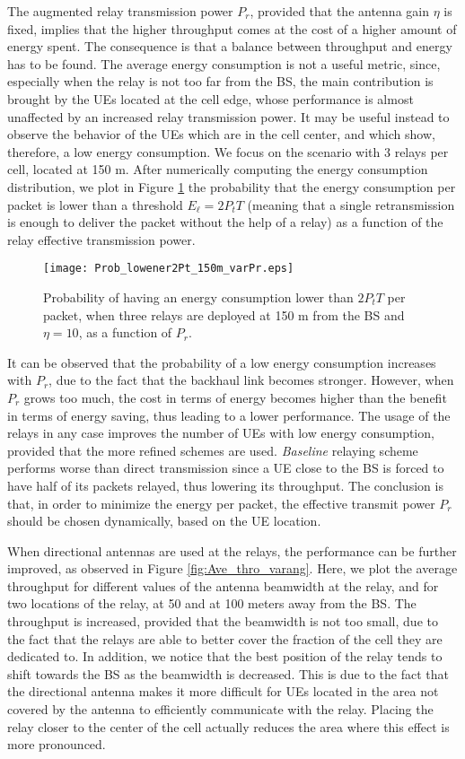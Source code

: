 \documentclass[12pt, letterpaper, onecolumn, draftcls]{IEEEtran}
\newcommand{\figw}{0.55\columnwidth}
\begin{document}
The augmented relay transmission power $P_r$, provided that the antenna gain $\eta$ is fixed, implies that the higher throughput comes at the cost of a higher amount of energy spent. The consequence is that a balance between throughput and energy has to be found.
The average energy consumption is not a useful metric, since, especially when the relay is not too far from the BS, the main contribution is brought by the UEs located at the cell edge, whose performance is almost unaffected by an increased relay transmission power.
It may be useful instead to observe the behavior of the UEs which are in the cell center, and which show, therefore, a low energy consumption. We focus on the scenario with 3 relays per cell, located at 150 m. After numerically computing the energy consumption distribution, we plot in Figure \ref{fig:Prob_lowener2Pt_150m_varPr} the probability that the energy consumption per packet is lower than a threshold $E_{\ell} = 2P_tT$ (meaning that a single retransmission is enough to deliver the packet without the help of a relay) as a function of the relay effective transmission power.
\begin{figure}
    \centering
    \texttt{[image: Prob\_lowener2Pt\_150m\_varPr.eps]}
     \caption{\small Probability of having an energy consumption lower than $2P_tT$ per packet, when three relays are deployed at 150 m from the BS and $\eta=10$, as a function of $P_r$.}
     \vspace{-1cm}
  \label{fig:Prob_lowener2Pt_150m_varPr}
\end{figure}
It can be observed that the probability of a low energy consumption increases with $P_r$, due to the fact that the backhaul link becomes stronger. However, when $P_r$ grows too much, the cost in terms of energy becomes higher than the benefit in terms of energy saving, thus leading to a lower performance.
The usage of the relays in any case improves the number of UEs with low energy consumption, provided that the more refined schemes are used. \textit{Baseline} relaying scheme performs worse than direct transmission since a UE close to the BS is forced to have half of its packets relayed, thus lowering its throughput.
The conclusion is that, in order to minimize the energy per packet, the effective transmit power $P_r$ should be chosen dynamically, based on the UE location.

When directional antennas are used at the relays, the performance can be further improved, as observed in Figure \ref{fig:Ave_thro_varang}. Here, we plot the average throughput for different values of the antenna beamwidth at the relay, and for two locations of the relay, at 50 and at 100 meters away from the BS. The throughput is increased, provided that the beamwidth is not too small, due to the fact that the relays are able to better cover the fraction of the cell they are dedicated to.
In addition, we notice that the best position of the relay tends to shift towards the BS as the beamwidth is decreased. This is due to the fact that the directional antenna makes it more difficult for UEs located in the area not covered by the antenna to efficiently communicate with the relay. Placing the relay closer to the center of the cell actually reduces the area where this effect is more pronounced.
\end{document}
